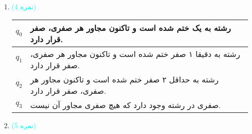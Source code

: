 \documentclass{article}
\begin{document}
\begin{enumerate}
		\begin{align*}
			&q_0 101 \longrightarrow 1q_3 01 \longrightarrow 10 q_4 1 \longrightarrow 101q_3 && \text{\textcolor{cyan}{(۱ نمره)}} \\
			&q_0 10010 \longrightarrow 1q_3 0010 \longrightarrow 10 q_4 010 \longrightarrow 100 q_4 10 \longrightarrow 1001 q_3 0 \longrightarrow 10010 q_4 && \text{\textcolor{cyan}{(۱ نمره)}}
		\end{align*}

		\item 
		
		\textcolor{cyan}{
			(4 نمره)
		}
		
		\begin{minipage}{0.5\textwidth}
			\begin{tabularx}{\linewidth}{|c|X|}
				\hline
				$q_0$ &		
رشته به یک ختم شده است و تاکنون مجاور هر صفری، صفر قرار دارد.
				\\ \hline
				$q_1$ &			
رشته به دقیقا ۱ صفر ختم شده است و تاکنون مجاور هر صفری، صفر قرار دارد.
				\\ \hline
				$q_2$ &		
رشته به حداقل ۲ صفر ختم شده است و تاکنون مجاور هر صفری، صفر قرار دارد.
				\\ \hline
				$q_3$ &				
صفری در رشته وجود دارد که هیچ صفری مجاور آن نیست.
				\\ \hline
			\end{tabularx}
		\end{minipage}
		\begin{minipage}{0.5\textwidth}
		\end{minipage}	
		
		\item 
		
		\textcolor{cyan}{
			(5 نمره)
		}


\end{enumerate}
\end{document}
